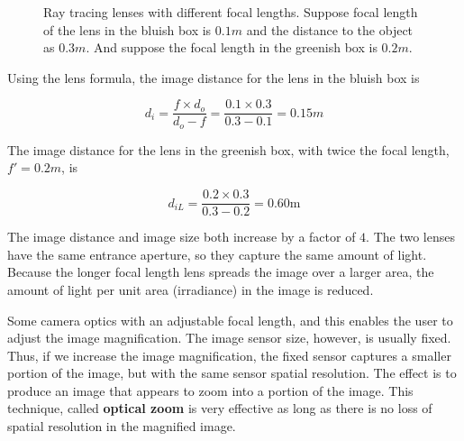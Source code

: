 \documentclass[
  letterpaper,
]{book}
\begin{document}
\begin{figure}


\caption{\label{fig-optics-magnification}Ray tracing lenses with
different focal lengths. Suppose focal length of the lens in the bluish
box is \(0.1 m\) and the distance to the object as \(0.3m\). And suppose
the focal length in the greenish box is \(0.2 m\).}

\end{figure}%

Using the lens formula, the image distance for the lens in the bluish
box is

\[
d_i = \frac{f \times d_o}{d_o - f} = \frac{0.1 \times 0.3}{0.3 - 0.1} = 0.15 m
\]

The image distance for the lens in the greenish box, with twice the
focal length, \(f' = 0.2m\), is

\[
d_{iL} = \frac{0.2 \times 0.3}{0.3 - 0.2} = 0.60 \text{m}
\]

The image distance and image size both increase by a factor of \(4\).
The two lenses have the same entrance aperture, so they capture the same
amount of light. Because the longer focal length lens spreads the image
over a larger area, the amount of light per unit area (irradiance) in
the image is reduced.

Some camera optics with an adjustable focal length, and this enables the
user to adjust the image magnification. The image sensor size, however,
is usually fixed. Thus, if we increase the image magnification, the
fixed sensor captures a smaller portion of the image, but with the same
sensor spatial resolution. The effect is to produce an image that
appears to zoom into a portion of the image. This technique, called
\textbf{optical zoom} is very effective as long as there is no loss of
spatial resolution in the magnified image.
\end{document}

